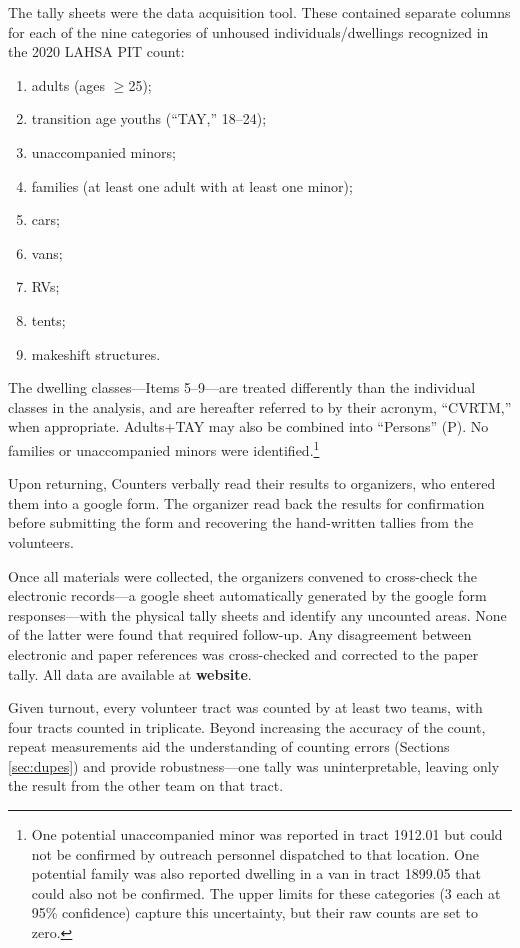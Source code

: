 \documentclass[11pt,twocolumn]{article}
\def\bfr{\bf\color{red}}
\begin{document}
The tally sheets were the data acquisition tool. These contained separate columns for each of the 
nine categories of unhoused individuals/dwellings recognized in the 2020 LAHSA PIT count: 
\begin{enumerate}
	\item adults (ages $\geq$25);
	\item transition age youths (``TAY,'' 18--24);
	\item unaccompanied minors;
	\item families (at least one adult with at least one minor); 
	\item cars;
	\item vans;
	\item RVs;
	\item tents;
	\item makeshift structures.
\end{enumerate}
The dwelling classes---Items 5--9---are treated differently than the individual classes in the analysis,
and are hereafter referred to by their acronym, ``CVRTM,'' when appropriate. Adults+TAY may
also be combined into ``Persons'' (P). No families or unaccompanied minors were identified.\footnote{
One potential unaccompanied minor was reported in tract 1912.01 but could not be confirmed by outreach
personnel dispatched to that location. One potential family was also reported dwelling in a van in
tract 1899.05 that could also not be confirmed. The upper limits for these categories (3 each at 95\%
confidence) capture this uncertainty, but their raw counts are set to zero.}

Upon returning,  Counters verbally read their results to organizers, who entered them into a google 
form. The organizer read back the results for confirmation before submitting the form and recovering the
hand-written tallies from the volunteers. 

Once all materials were collected, the organizers convened to cross-check the electronic records---a
google sheet automatically generated by the google form responses---with the physical tally sheets and 
identify any uncounted areas. None of the latter were found that required follow-up. Any disagreement 
between electronic and paper references was cross-checked and corrected to the paper tally. All 
data are available at {\bfr website}.

Given turnout, every volunteer tract was counted by at least two teams, with four tracts counted in 
triplicate. Beyond increasing the accuracy of the count, repeat measurements aid the understanding of 
counting errors (Sections \ref{sec:dupes}) and provide robustness---one tally was uninterpretable, leaving 
only the result from the other team on that tract.
\end{document}
